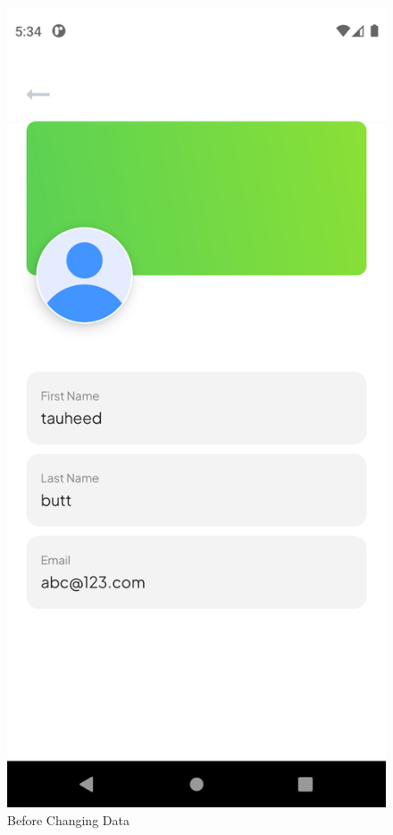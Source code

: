\begin{figure}[!htb]
	\begin{minipage}{0.48\textwidth}
		\centering
		\includegraphics[width=0.8\linewidth]{figures/Testing/change1.png}
		\caption{Before Changing Data}\label{Fig:Data1}
	\end{minipage}\hfill
	\begin{minipage}{0.48\textwidth}
		\centering

\end{minipage}
\end{figure}
